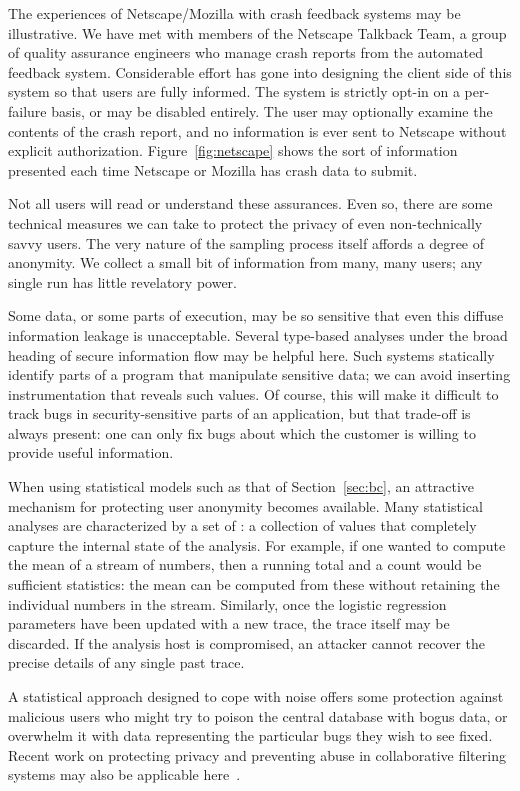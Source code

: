 The experiences of Netscape/Mozilla with crash feedback systems may be
illustrative.  We have met with members of the Netscape Talkback Team,
a group of quality assurance engineers who manage crash reports from
the automated feedback system.  Considerable effort has gone into
designing the client side of this system so that users are fully
informed.  The system is strictly opt-in on a per-failure basis, or
may be disabled entirely.  The user may optionally examine the
contents of the crash report, and no information is ever sent to
Netscape without explicit authorization.  Figure~\ref{fig:netscape}
shows the sort of information presented each time Netscape or Mozilla
has crash data to submit.

Not all users will read or understand these assurances.  Even so,
there are some technical measures we can take to protect the privacy
of even non-technically savvy users.  The very nature of the sampling
process itself affords a degree of anonymity.  We collect a small bit
of information from many, many users; any single run has little
revelatory power.

Some data, or some parts of execution, may be so sensitive that even
this diffuse information leakage is unacceptable.  Several type-based
analyses under the broad heading of secure information flow
\cite{Broadwell:2003:SSGSCI,1997:tapsoft:volpano,ZdZhNyMy2001} may be
helpful here.  Such systems statically identify parts of a program
that manipulate sensitive data; we can avoid inserting instrumentation
that reveals such values.  Of course, this will make it difficult to
track bugs in security-sensitive parts of an application, but that
trade-off is always present: one can only fix bugs about which 
the customer is willing to provide useful information.

When using statistical models such as that of Section~\ref{sec:bc}, an
attractive mechanism for protecting user anonymity becomes available.
Many statistical analyses are characterized by a set of
: a collection of values that
completely capture the internal state of the analysis.  For example,
if one wanted to compute the mean of a stream of numbers, then a
running total and a count would be sufficient statistics: the mean can
be computed from these without retaining the individual numbers in the
stream.  Similarly, once the logistic regression parameters have been
updated with a new trace, the trace itself may be discarded.  If the
analysis host is compromised, an attacker cannot recover the precise
details of any single past trace.

A statistical approach designed to cope with noise offers some
protection against malicious users who might try to poison the central
database with bogus data, or overwhelm it with data representing the
particular bugs they wish to see fixed.  Recent work on protecting
privacy and preventing abuse in collaborative filtering systems may
also be applicable here~\cite{Canny2002,EC00*150}.



